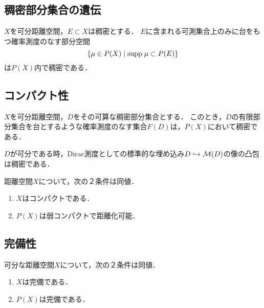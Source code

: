 \documentclass[uplatex,dvipdfmx]{jsreport}
\begin{document}
\subsection{稠密部分集合の遺伝}

\begin{theorem}
    $X$を可分距離空間，$E\subset X$は稠密とする．
    $E$に含まれる可測集合上のみに台をもつ確率測度のなす部分空間
    \[\left\{\mu\in P(X)\mid\mathrm{supp}\;\mu\subset P(E)\right\}\]
    は$P(X)$内で稠密である．
\end{theorem}

\subsection{コンパクト性}

\begin{theorem}[可算稠密部分集合の構成]
    $X$を可分距離空間，$D$をその可算な稠密部分集合とする．
    このとき，$D$の有限部分集合を台とするような確率測度のなす集合$F(D)$は，$P(X)$において稠密である．
\end{theorem}

\begin{corollary}
    $D$が可分である時，Dirac測度としての標準的な埋め込み$D\hookrightarrow\mathcal{M}(D)$の像の凸包は稠密である．
\end{corollary}

\begin{theorem}
    距離空間$X$について，次の２条件は同値．
    \begin{enumerate}
        \item $X$はコンパクトである．
        \item $P(X)$は弱コンパクトで距離化可能．
    \end{enumerate}
\end{theorem}

\subsection{完備性}

\begin{theorem}[完備性]
    可分な距離空間$X$について，次の２条件は同値．
    \begin{enumerate}
        \item $X$は完備である．
        \item $P(X)$は完備である．
    \end{enumerate}
\end{theorem}
\end{document}
